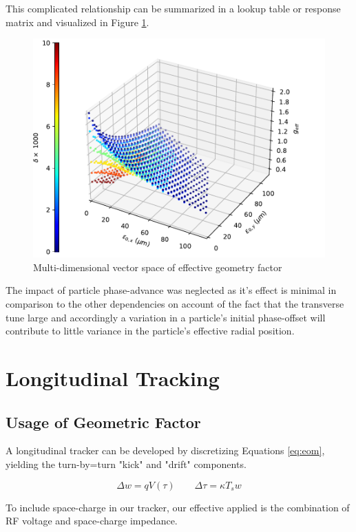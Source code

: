 This complicated relationship can be summarized in a lookup table or response matrix and visualized in Figure \ref{fig:g_eff_vol}.

\begin{figure}
    \centering
    \includegraphics{figs/g_eff.surface.0.pdf}
    \caption{Multi-dimensional vector space of effective geometry factor}
    \label{fig:g_eff_vol}
\end{figure}

The impact of particle phase-advance was neglected as it's effect is minimal in comparison to the other dependencies on account of the fact that the transverse tune large and accordingly a variation in a particle's initial phase-offset will contribute to little variance in the particle's effective radial position.

\section{Longitudinal Tracking}

\subsection{Usage of Geometric Factor}

A longitudinal tracker can be developed by discretizing Equations \ref{eq:eom}, yielding the turn-by=turn "kick" and "drift" components.

$$\Delta w = qV(\tau) \qquad \Delta\tau = \kappa T_s w$$

To include space-charge in our tracker, our effective applied is the combination of RF voltage and space-charge impedance.

